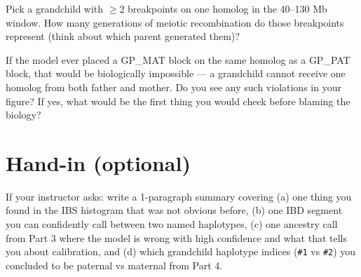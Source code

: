 \documentclass[11pt]{article}
\begin{document}
\begin{quest}[4.2]
Pick a grandchild with $\ge 2$ breakpoints on one homolog in the
40--130 Mb window. How many generations of meiotic recombination do
those breakpoints represent (think about which parent generated them)?
\end{quest}

\begin{quest}[4.3]
If the model ever placed a GP\_MAT block on the same homolog as a
GP\_PAT block, that would be biologically impossible --- a grandchild
cannot receive one homolog from both father and mother. Do you see any
such violations in your figure? If yes, what would be the first thing
you would check before blaming the biology?
\end{quest}

\section*{Hand-in (optional)}

If your instructor asks: write a 1-paragraph summary covering
(a) one thing you found in the IBS histogram that was not obvious before,
(b) one IBD segment you can confidently call between two named
haplotypes, (c) one ancestry call from Part 3 where the model is wrong
with high confidence and what that tells you about calibration, and
(d) which grandchild haplotype indices (\texttt{\#1} vs \texttt{\#2})
you concluded to be paternal vs maternal from Part 4.
\end{document}
